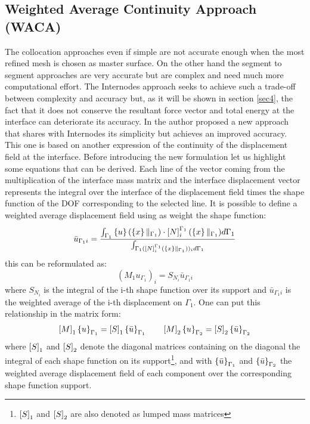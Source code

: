 \subsection{Weighted Average Continuity Approach (WACA)}\label{sssec36}
The collocation approaches even if simple are not accurate enough when the most refined mesh is chosen as master surface. On the other hand the segment to segment approaches are very accurate but are complex and need much more computational effort. The Internodes approach seeks to achieve such a trade-off between complexity and accuracy but, as it will be shown in section \ref{sec4}, the fact that it does not conserve the resultant force vector and total energy at the interface can deteriorate its accuracy. In \cite{coniglio2018weighted} the author proposed a new approach that shares with Internodes its simplicity but achieves an improved accuracy.
This one is based on another expression of the continuity of the displacement field at the interface. Before introducing the new formulation let us highlight some equations that can be derived. Each line of the vector coming from the multiplication of the interface mass matrix and the interface displacement vector represents the integral over the interface of the displacement field times the shape function of the DOF corresponding to the selected line. It is possible to define a weighted average displacement field using as weight the shape function:
\begin{equation}
\label{eq.73a}
\bar{u}_{\Gamma_1i}=\frac{\int_{\Gamma_1}\left\lbrace{u}\right \rbrace(\left\lbrace{x}\right \rbrace\|_{\Gamma_1})\cdot\left[{N}\right]_{i}^{\Gamma_1}(\left\lbrace{x}\right \rbrace\|_{\Gamma_1})d\Gamma_1}{\int_{\Gamma_1(\left[{N}\right]_{i}^{\Gamma_1}(\left\lbrace{x}\right \rbrace\|_{\Gamma_1}))_id\Gamma_1}}
\end{equation}
this can be reformulated as:
\begin{equation}
\label{eq.73}
({M}_{1}{u}_{\Gamma_1})_i=S_{N_i}\bar{u}_{\Gamma_1i}
\end{equation}
where $S_{N_i}$ is the integral of the i-th shape function over its support  and $\bar{u}_{\Gamma_1i}$ is the weighted average of the i-th displacement on $\Gamma_1$. 
One can put this relationship in the matrix form:
\begin{eqnarray}
\label{eq.74}
\left[{M}\right]_{1}\left\lbrace{u}\right \rbrace_{\Gamma_1}=\left[{S}\right]_1\left\lbrace{\bar{u}}\right \rbrace_{\Gamma_1}\qquad
\left[{M}\right]_{2}\left\lbrace{u}\right \rbrace_{\Gamma_2}=\left[{S}\right]_2\left\lbrace{\bar{u}}\right \rbrace_{\Gamma_2}
\end{eqnarray}
where $\left[{S}\right]_1$ and $\left[{S}\right]_2$ denote the diagonal matrices containing on the diagonal the integral of each shape function on its support\footnote{$\left[{S}\right]_1$ and $\left[{S}\right]_2$ are also denoted as lumped mass matrices}, and with $\left\lbrace{\bar{u}}\right \rbrace_{\Gamma_1}$ and $\left\lbrace{\bar{u}}\right \rbrace_{\Gamma_2}$ the weighted average displacement field of each component over the corresponding shape function support.

